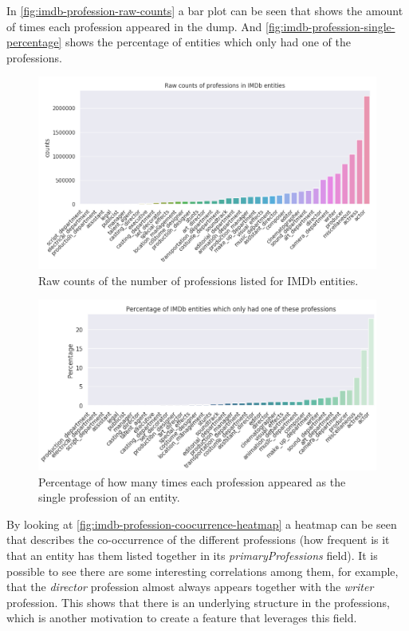 \documentclass[epsfig,a4paper,11pt,titlepage,twoside,openany]{book}
\begin{document}
In \autoref{fig:imdb-profession-raw-counts} a bar plot can be seen that shows the amount of times each profession appeared in the dump. And \autoref{fig:imdb-profession-single-percentage} shows the percentage of entities which only had one of the professions.

\begin{figure}[H]
  \centering \includegraphics[width=\textwidth]{raw_profession_counts_imdb}
  \caption{Raw counts of the number of professions listed for IMDb entities.}
  \label{fig:imdb-profession-raw-counts}
\end{figure}


\begin{figure}[H]
  \centering \includegraphics[width=\textwidth]{imdb_percentage_single_professions}
  \caption{Percentage of how many times each profession appeared as the single profession of an entity.}
  \label{fig:imdb-profession-single-percentage}
\end{figure}


By looking at \autoref{fig:imdb-profession-coocurrence-heatmap} a heatmap can be seen that describes the co-occurrence of the different professions (how frequent is it that an entity has them listed together in its \textit{primaryProfessions} field). It is possible to see there are some interesting correlations among them, for example, that the \textit{director} profession almost always appears together with the \textit{writer} profession. This shows that there is an underlying structure in the professions, which is another motivation to create a feature that leverages this field.
\end{document}
